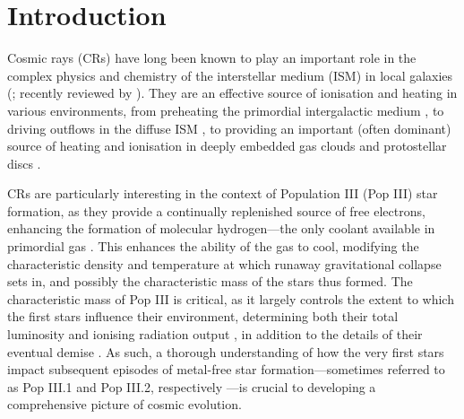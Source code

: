 \section{Introduction}
\label{intro}

Cosmic rays (CRs) have long been known to play an important role in the complex physics and chemistry of the interstellar medium (ISM) in local galaxies (\citealt{SpitzerTomasko1968,SpitzerScott1969,GlassgoldLanger1973,GoldsmithLanger1978,CravensDalgarno1978,MannheimSchlickeiser1994,Tielens2005}; recently reviewed by \citealt{StrongMoskalenkoPtuskin2007,GrenierBlackStrong2015}).  
They are an effective source of ionisation and heating in various environments, from preheating the primordial intergalactic medium  \citep[IGM;][]{SazonovSunyaev2015}, to driving outflows in the diffuse ISM \citep[e.g.,][]{Ensslinetal2007,Jubelgasetal2008,SalemBryan2014,Hanaszetal2013,Boothetal2013,SalemBryanHummels2014}, to providing an important (often dominant) source of heating and ionisation in deeply embedded gas clouds and protostellar discs \citep{Spitzer1978,DalgarnoYanLiu1999,IndrioloFieldsMcCall2009,PadovaniGalliGlassgold2009,GlassgoldGalliPadovani2012,PadovaniHennebelleGalli2013,Padovanietal2015}. 

CRs are particularly interesting in the context of Population III (Pop III) star formation, as they provide a continually replenished source of free electrons, enhancing the formation of molecular hydrogen---the only coolant available in primordial gas \citep{LeppShull1984,Abeletal1997,GalliPalla1998,BrommCoppiLarson2002,GloverAbel2008}.  
This enhances the ability of the gas to cool, modifying the characteristic density and temperature at which runaway gravitational collapse sets in, and possibly the characteristic mass of the stars thus formed.   
The characteristic mass of Pop III is critical, as it largely controls the extent to which the first stars influence their environment, determining both their total luminosity and ionising radiation output \citep{Schaerer2002}, in addition to the details of their eventual demise \citep{Hegeretal2003,HegerWoosley2010,MaederMeynet2012}. 
As such, a thorough understanding of how the very first stars impact subsequent episodes of metal-free star formation---sometimes referred to as Pop III.1 and Pop III.2, respectively \citep{McKeeTan2008}---is crucial to developing a comprehensive picture of cosmic evolution.

